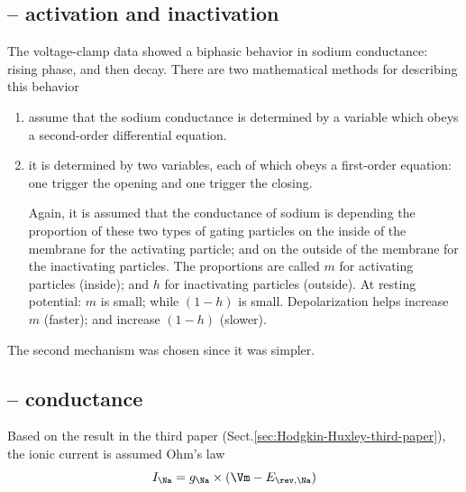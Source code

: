 \subsection{-- activation and inactivation}

The voltage-clamp data showed a biphasic behavior in sodium conductance: rising
phase, and then decay. There are two mathematical methods for describing this
behavior
\begin{enumerate}
  \item assume that the sodium conductance is determined by a variable which
  obeys a second-order differential equation.

  \item it is determined by two variables, each of which obeys a first-order
  equation: one trigger the opening and one trigger the closing.
  
  Again, it is assumed that the conductance of sodium is depending the
  proportion of these two types of gating particles on the inside of the
  membrane for the activating particle; and on the outside of the membrane for
  the inactivating particles. The proportions are called $m$ for activating
  particles (inside); and $h$ for inactivating particles (outside). At resting
  potential: $m$ is small; while $(1-h)$ is small. Depolarization helps increase
  $m$ (faster); and increase $(1-h)$ (slower).
  
  
\end{enumerate}
The second mechanism was chosen since it was simpler. 




\subsection{-- conductance}
\label{sec:conductance-Na+-current-HH}

Based on the result in the third paper
(Sect.\ref{sec:Hodgkin-Huxley-third-paper}), the ionic current is assumed Ohm's law
\begin{equation}
I_{\Na} = g_{\Na} \times (\Vm - E_{\rev,\Na})
\end{equation}

